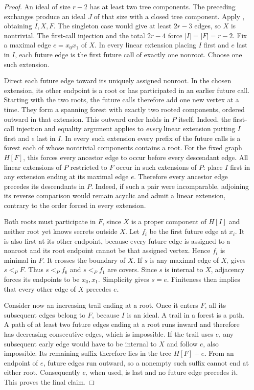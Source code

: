 \documentclass[USenglish, a4paper, thm-restate,numberwithinsect, cleveref]{lipics-v2021}
\begin{document}
\begin{proof}
An ideal of size $r-2$ has at least two tree components. The preceding
exchanges produce an ideal $J$ of that size with a closed tree
component. Apply , obtaining
$I,X,F$. The singleton case would give at least $2r-3$ edges, so
$X$ is nontrivial. The first-call injection and the total $2r-4$
force $|I|=|F|=r-2$. Fix a maximal edge $e=x_0x_1$ of $X$.
In every linear extension placing $I$ first and $e$ last in $I$,
each future edge is the first future call of exactly one nonroot.
Choose one such extension.

Direct each future edge toward its uniquely assigned nonroot. In the
chosen extension, its other endpoint is a root or has participated in
an earlier future call. Starting with the two roots, the future calls
therefore add one new vertex at a time. They form a spanning forest
with exactly two rooted components, ordered outward in that extension.
This outward order holds in $P$ itself. Indeed, the first-call
injection and equality argument applies to \emph{every} linear
extension putting $I$ first and $e$ last in $I$. In every such
extension every prefix of the future calls is a forest each of whose
nontrivial components contains a root. For the fixed graph $H[F]$, this forces
every ancestor edge to occur before every descendant edge. All linear
extensions of $P$ restricted to $F$ occur in such extensions of $P$:
place $I$ first in any extension ending at its maximal edge $e$.
Therefore every ancestor edge precedes its descendants in $P$.
Indeed, if such a pair were incomparable, adjoining its reverse
comparison would remain acyclic and admit a linear extension,
contrary to the order forced in every extension.

Both roots must participate in $F$, since $X$ is a proper component
of $H[I]$ and neither root yet knows secrets outside $X$. Let $f_i$
be the first future edge at $x_i$. It is also first at its other
endpoint, because every future edge is assigned to a nonroot and
its root endpoint cannot be that assigned vertex. Hence $f_i$ is
minimal in $F$. It crosses the boundary of $X$.
If $s$ is any maximal edge of $X$,
 gives $s<_P F$.
Thus $s<_P f_0$ and $s<_P f_1$
are covers. Since $s$ is internal to $X$, adjacency forces its
endpoints to be $x_0,x_1$. Simplicity gives $s=e$. Finiteness then
implies that every other edge of $X$ precedes $e$.

Consider now an increasing trail ending at a root. Once it enters
$F$, all its subsequent edges belong to $F$, because $I$ is an ideal.
A trail in a forest is a path. A path of at least two future edges
ending at a root runs inward and therefore has decreasing consecutive
edges, which is impossible. If the trail uses $e$, any subsequent
early edge would have to be internal to $X$ and follow $e$, also
impossible. Its remaining suffix therefore lies in the tree $H[F]+e$.
From an endpoint of $e$, future edges run outward, so a nonempty
such suffix cannot end at either root. Consequently $e$, when used,
is last and no future edge precedes it. This proves the final claim.
\end{proof}
\end{document}
